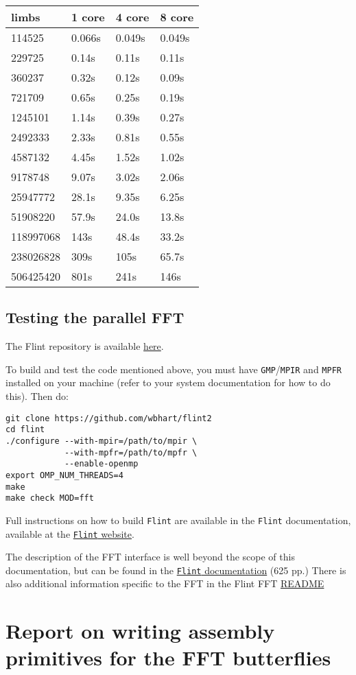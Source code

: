 \begin{longtable}[c]{@{}llll@{}}
\toprule
limbs & 1 core & 4 core & 8 core\tabularnewline
\midrule
\endhead
114525 & 0.066s & 0.049s & 0.049s\tabularnewline
229725 & 0.14s & 0.11s & 0.11s\tabularnewline
360237 & 0.32s & 0.12s & 0.09s\tabularnewline
721709 & 0.65s & 0.25s & 0.19s\tabularnewline
1245101 & 1.14s & 0.39s & 0.27s\tabularnewline
2492333 & 2.33s & 0.81s & 0.55s\tabularnewline
4587132 & 4.45s & 1.52s & 1.02s\tabularnewline
9178748 & 9.07s & 3.02s & 2.06s\tabularnewline
25947772 & 28.1s & 9.35s & 6.25s\tabularnewline
51908220 & 57.9s & 24.0s & 13.8s\tabularnewline
118997068 & 143s & 48.4s & 33.2s\tabularnewline
238026828 & 309s & 105s & 65.7s\tabularnewline
506425420 & 801s & 241s & 146s\tabularnewline
\bottomrule
\end{longtable}

\subsection{Testing the parallel FFT}\label{testing-the-parallel-fft}

The Flint repository is available
\href{https://github.com/wbhart/flint2}{here}.

To build and test the code mentioned above, you must have
\texttt{GMP}/\texttt{MPIR} and \texttt{MPFR} installed on your machine
(refer to your system documentation for how to do this). Then do:

\begin{verbatim}
git clone https://github.com/wbhart/flint2
cd flint
./configure --with-mpir=/path/to/mpir \
            --with-mpfr=/path/to/mpfr \
            --enable-openmp
export OMP_NUM_THREADS=4
make
make check MOD=fft
\end{verbatim}

Full instructions on how to build \texttt{Flint} are available in the
\texttt{Flint} documentation, available at the
\href{http://flintlib.org/}{\texttt{Flint} website}.

The description of the FFT interface is well beyond the scope of this
documentation, but can be found in the
\href{http://flintlib.org/flint-2.5.pdf}{\texttt{Flint} documentation}
(625 pp.) There is also additional information specific to the FFT in
the Flint FFT
\href{https://github.com/wbhart/flint2/tree/trunk/fft}{README}

\section{Report on writing assembly primitives for the FFT
butterflies}\label{report-on-writing-assembly-primitives-for-the-fft-butterflies}


